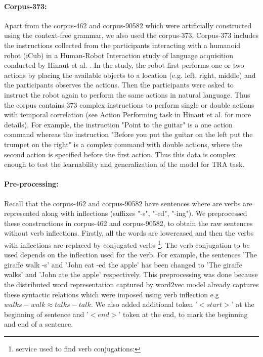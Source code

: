 \paragraph{Corpus-373: }Apart from the corpus-462 and corpus-90582 which were artificially constructed using the context-free grammar, we also used the corpus-373. Corpus-373 includes the instructions collected from the participants interacting with a humanoid robot (iCub) in a Human-Robot Interaction study of language acquisition conducted by Hinaut et al. \cite{tra:xavier_hri}. In the study, the robot first performs one or two actions by placing the available objects to a location (e.g. left, right, middle) and the participants observes the actions. Then the participants were asked to instruct the robot again to perform the same actions in natural language. Thus the corpus contains 373 complex instructions to perform single or double actions with temporal correlation (see Action Performing task in Hinaut et al. \cite{tra:tra:xavier_hri} for more details). For example, the instruction "Point to the guitar" is a one action command whereas the instruction "Before you put the guitar on the left put the trumpet on the right" is a complex command with double actions, where the second action is specified before the first action. Thus this data is complex enough to test the learnability and generalization of the model for TRA task.

\paragraph{Pre-processing: } Recall that the corpus-462 and corpus-90582 have sentences where are verbs are represented along with inflections (suffixes "-s", "-ed", "-ing"). We preprocessed these constructions in corpus-462 and corpus-90582, to obtain the raw sentences without verb inflections.  Firstly, all the words are lowercased and then the verbs with inflections are replaced by conjugated verbs \footnote{service used to find verb conjugations: }. The verb conjugation to be used depends on the inflection used for the verb. For example, the sentences 'The giraffe walk -s' and 'John eat -ed the apple' has been changed to 'The giraffe walks' and 'John ate the apple' respectively. This preprocessing was done because the distributed word representation captured by word2vec model already captures these syntactic relations which were imposed using verb inflection e.g $walks - walk \approx talks - talk$. We also added additional token '$<start>$' at the beginning of sentence and '$<end>$' token at the end, to mark the beginning and end of a sentence.
  
